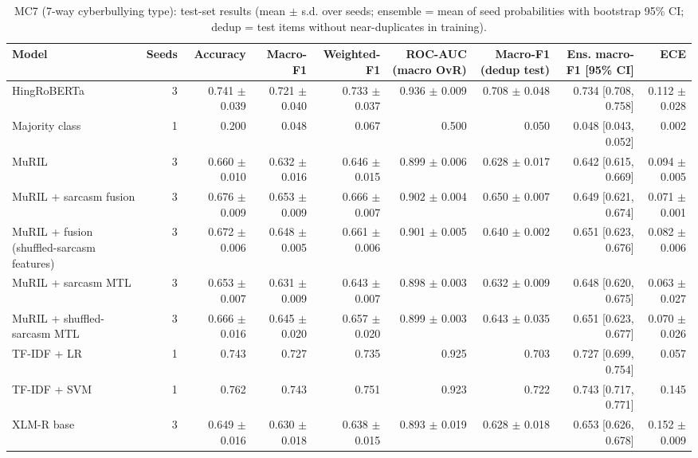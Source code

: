 \documentclass[10pt,twocolumn]{article}
\begin{document}
\begin{table}[t]
\centering
\small
\caption{MC7 (7-way cyberbullying type): test-set results (mean $\pm$ s.d. over seeds; ensemble = mean of seed probabilities with bootstrap 95\% CI; dedup = test items without near-duplicates in training).}
\label{tab:mc7}
\begin{adjustbox}{max width=\textwidth}\begin{tabular}{lrrrrrrrr}
\toprule
Model & Seeds & Accuracy & Macro-F1 & Weighted-F1 & ROC-AUC (macro OvR) & Macro-F1 (dedup test) & Ens. macro-F1 [95\% CI] & ECE \\
\midrule
HingRoBERTa & 3 & 0.741 $\pm$ 0.039 & 0.721 $\pm$ 0.040 & 0.733 $\pm$ 0.037 & 0.936 $\pm$ 0.009 & 0.708 $\pm$ 0.048 & 0.734 [0.708, 0.758] & 0.112 $\pm$ 0.028 \\
Majority class & 1 & 0.200 & 0.048 & 0.067 & 0.500 & 0.050 & 0.048 [0.043, 0.052] & 0.002 \\
MuRIL & 3 & 0.660 $\pm$ 0.010 & 0.632 $\pm$ 0.016 & 0.646 $\pm$ 0.015 & 0.899 $\pm$ 0.006 & 0.628 $\pm$ 0.017 & 0.642 [0.615, 0.669] & 0.094 $\pm$ 0.005 \\
MuRIL + sarcasm fusion & 3 & 0.676 $\pm$ 0.009 & 0.653 $\pm$ 0.009 & 0.666 $\pm$ 0.007 & 0.902 $\pm$ 0.004 & 0.650 $\pm$ 0.007 & 0.649 [0.621, 0.674] & 0.071 $\pm$ 0.001 \\
MuRIL + fusion (shuffled-sarcasm features) & 3 & 0.672 $\pm$ 0.006 & 0.648 $\pm$ 0.005 & 0.661 $\pm$ 0.006 & 0.901 $\pm$ 0.005 & 0.640 $\pm$ 0.002 & 0.651 [0.623, 0.676] & 0.082 $\pm$ 0.006 \\
MuRIL + sarcasm MTL & 3 & 0.653 $\pm$ 0.007 & 0.631 $\pm$ 0.009 & 0.643 $\pm$ 0.007 & 0.898 $\pm$ 0.003 & 0.632 $\pm$ 0.009 & 0.648 [0.620, 0.675] & 0.063 $\pm$ 0.027 \\
MuRIL + shuffled-sarcasm MTL & 3 & 0.666 $\pm$ 0.016 & 0.645 $\pm$ 0.020 & 0.657 $\pm$ 0.020 & 0.899 $\pm$ 0.003 & 0.643 $\pm$ 0.035 & 0.651 [0.623, 0.677] & 0.070 $\pm$ 0.026 \\
TF-IDF + LR & 1 & 0.743 & 0.727 & 0.735 & 0.925 & 0.703 & 0.727 [0.699, 0.754] & 0.057 \\
TF-IDF + SVM & 1 & 0.762 & 0.743 & 0.751 & 0.923 & 0.722 & 0.743 [0.717, 0.771] & 0.145 \\
XLM-R base & 3 & 0.649 $\pm$ 0.016 & 0.630 $\pm$ 0.018 & 0.638 $\pm$ 0.015 & 0.893 $\pm$ 0.019 & 0.628 $\pm$ 0.018 & 0.653 [0.626, 0.678] & 0.152 $\pm$ 0.009 \\
\bottomrule
\end{tabular}\end{adjustbox}
\end{table}
\end{document}
